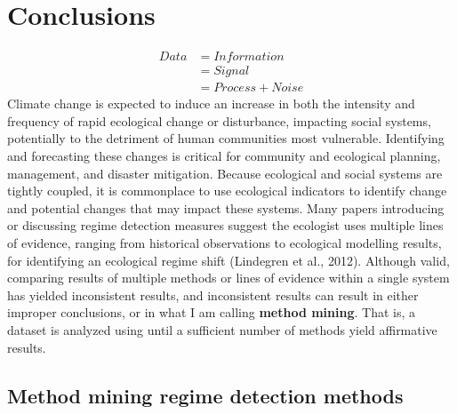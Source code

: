 \documentclass[12pt,twoside,openany]{reedthesis}
\begin{document}
\hypertarget{conclusions-1}{%
\chapter{Conclusions}\label{conclusions-1}}
\begin{equation}
\begin{split}
Data  & = Information \\
& = Signal \\
& = Process + Noise
\end{split}
\label{eq:infoTheory}
\end{equation}
Climate change is expected to induce an increase in both the intensity and frequency of rapid ecological change or disturbance, impacting social systems, potentially to the detriment of human communities most vulnerable. Identifying and forecasting these changes is critical for community and ecological planning, management, and disaster mitigation. Because ecological and social systems are tightly coupled, it is commonplace to use ecological indicators to identify change and potential changes that may impact these systems. Many papers introducing or discussing regime detection measures suggest the ecologist uses multiple lines of evidence, ranging from historical observations to ecological modelling results, for identifying an ecological regime shift (Lindegren et al., 2012). Although valid, comparing results of multiple methods or lines of evidence within a single system has yielded inconsistent results, and inconsistent results can result in either improper conclusions, or in what I am calling \textbf{method mining}. That is, a dataset is analyzed using until a sufficient number of methods yield affirmative results.

\hypertarget{method-mining-regime-detection-methods}{%
\section{Method mining regime detection methods}\label{method-mining-regime-detection-methods}}
\end{document}
